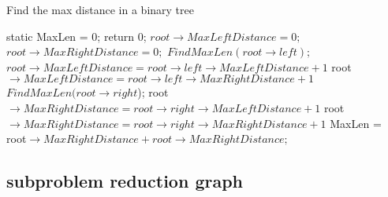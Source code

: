 \documentclass{article}
\begin{document}
\begin{algorithm}[htbp] 
  \caption{Find the max distance in a binary tree}  
  \begin{algorithmic}[1] 
	\State static MaxLen = 0;
	 \State return 0; 
      \EndIf
	 \State $root\rightarrow MaxLeftDistance = 0; $
      \EndIf 
	 \State $root\rightarrow MaxRightDistance = 0;$
      \EndIf 
	 \State $FindMaxLen(root\rightarrow left);$
	\State $root\rightarrow MaxLeftDistance = root\rightarrow left\rightarrow MaxLeftDistance + 1$
	\Else
	\State root$\rightarrow MaxLeftDistance = root\rightarrow left\rightarrow MaxRightDistance + 1$
      \EndIf 
	\EndIf 
	 \State $FindMaxLen(root\rightarrow right$);
	\State root$\rightarrow MaxRightDistance = root\rightarrow right\rightarrow MaxLeftDistance + 1$
	\Else
	\State root$\rightarrow MaxRightDistance = root\rightarrow right\rightarrow MaxRightDistance + 1$
	\EndIf 
      \EndIf 
	 \State MaxLen = root$\rightarrow MaxRightDistance + root\rightarrow MaxRightDistance;$
      \EndIf 
    \EndFunction  
  \end{algorithmic}  
\end{algorithm} 

\subsection{subproblem reduction graph}
\end{document}
